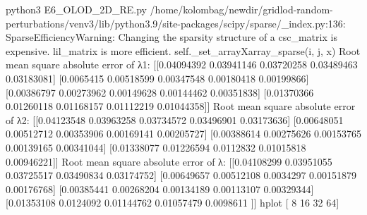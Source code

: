 python3 E6_OLOD_2D_RE.py
/home/kolombag/newdir/gridlod-random-perturbations/venv3/lib/python3.9/site-packages/scipy/sparse/_index.py:136: SparseEfficiencyWarning: Changing the sparsity structure of a csc_matrix is expensive. lil_matrix is more efficient.
  self._set_arrayXarray_sparse(i, j, x)
Root mean square absolute error of λ1:
 [[0.04094392 0.03941146 0.03720258 0.03489463 0.03183081]
 [0.0065415  0.00518599 0.00347548 0.00180418 0.00199866]
 [0.00386797 0.00273962 0.00149628 0.00144462 0.00351838]
 [0.01370366 0.01260118 0.01168157 0.01112219 0.01044358]]
Root mean square absolute error of λ2: 
 [[0.04123548 0.03963258 0.03734572 0.03496901 0.03173636]
 [0.00648051 0.00512712 0.00353906 0.00169141 0.00205727]
 [0.00388614 0.00275626 0.00153765 0.00139165 0.00341044]
 [0.01338077 0.01226594 0.0112832  0.01015818 0.00946221]]
Root mean square absolute error of λ: 
 [[0.04108299 0.03951055 0.03725517 0.03490834 0.03174752]
 [0.00649657 0.00512108 0.0034297  0.00151879 0.00176768]
 [0.00385441 0.00268204 0.00134189 0.00113107 0.00329344]
 [0.01353108 0.0124092  0.01144762 0.01057479 0.0098611 ]]
hplot [ 8 16 32 64]